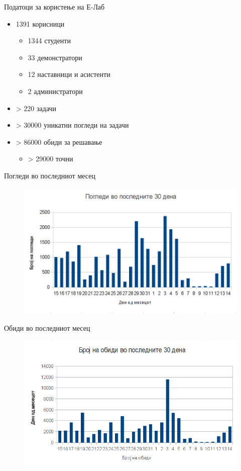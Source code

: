 \begin{frame}{Податоци за користење на Е-Лаб}
\begin{itemize}
  \item 1391 корисници
    \begin{itemize}
    \item 1344 студенти
    \item 33 демонстратори
    \item 12 наставници и асистенти
    \item 2 администратори
    \end{itemize}
    \item > 220 задачи
    \item > 30000 уникатни погледи на задачи
    \item > 86000 обиди за решавање
    \begin{itemize}
        \item > 29000 точни
    \end{itemize}
\end{itemize}
\end{frame}

\begin{frame}{Погледи во последниот месец}
    \begin{figure}
    \centering
        \includegraphics[width=.99\textwidth]{images/views}
    \end{figure}
\end{frame}

\begin{frame}{Обиди во последниот месец}
    \begin{figure}
    \centering
        \includegraphics[width=.99\textwidth]{images/attempts}
    \end{figure}
\end{frame}

